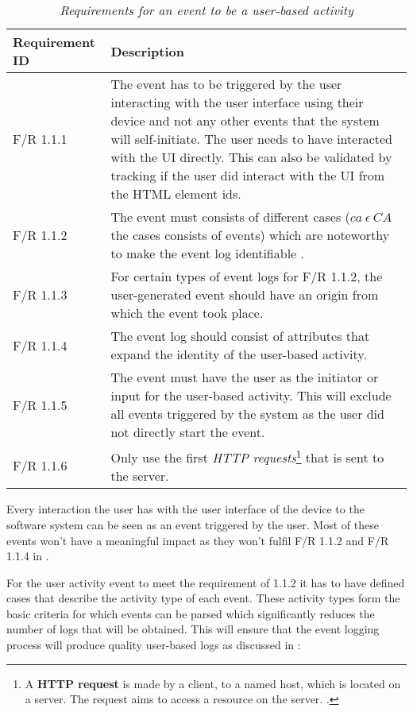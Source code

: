 \begin{table}[!htb]
	\centering
	\caption[Requirements for an event to be a user-based activity]
	{\textit{Requirements for an event to be a user-based activity}}
	\label{tbl:ch2_requirementsForUserActivtyEvent}
	\begin{tabularx}{\textwidth}{|l|X|}
		\hline \textbf{Requirement ID} & \textbf{Description}\\
		\hline F/R 1.1.1 & The event has to be triggered by the user interacting with the user interface using their device and not any other events that the system will self-initiate. The user needs to have interacted with the UI directly. This can also be validated by tracking if the user did interact with the UI from the HTML element ids. \\
		\hline F/R 1.1.2 & The event must consists of different cases ($ca~ \epsilon~CA$ the cases consists of events) which are noteworthy to make the event log identifiable \cite{Slaninova2014}. \\
		\hline F/R 1.1.3 & For certain types of event logs for F/R 1.1.2, the user-generated event should have an origin from which the event took place. \\
		\hline F/R 1.1.4 & The event log should consist of attributes that expand the identity of the user-based activity. \\
		\hline F/R 1.1.5 & The event must have the user as the initiator or input for the user-based activity. This will exclude all events triggered by the system as the user did not directly start the event. \\
		\hline F/R 1.1.6 & Only use the first \textit{HTTP requests}\footnote{A \textbf{HTTP request} is made by a client, to a named host, which is located on a server. The request aims to access a resource on the server. \cite{IBM2021}.} that is sent to the server. \\ 
		\hline
	\end{tabularx}
\end{table}

Every interaction the user has with the user interface of the device to the software system can be seen as an event triggered by the user. Most of these events won't have a meaningful impact as they won't fulfil F/R 1.1.2 and F/R 1.1.4 in .\par For the user activity event to meet the requirement of 1.1.2 it has to have defined cases that describe the activity type of each event. These activity types form the basic criteria for which events can be parsed which significantly reduces the number of logs that will be obtained. This will ensure that the event logging process will produce quality user-based logs as discussed in :

